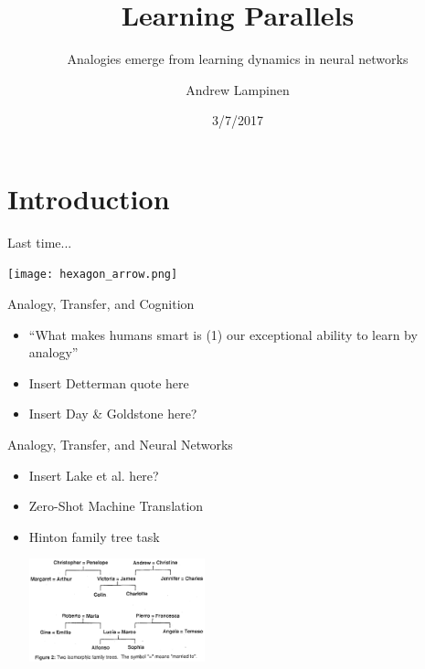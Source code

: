 \documentclass{beamer}
\begin{document}
\title{Learning Parallels}
\subtitle{Analogies emerge from learning dynamics in neural networks}
\author{Andrew Lampinen}
\date{3/7/2017}
\frame{\titlepage}


\section{Introduction}
\begin{frame}{Last time...}
\begin{center}
\texttt{[image: hexagon\_arrow.png]}
\end{center}
\end{frame}

\begin{frame}{Analogy, Transfer, and Cognition}
\begin{itemize}
    \item<1-> ``What makes humans smart is (1) our exceptional ability to learn by analogy'' \cite{Gentner2003} 
    \item<2-> Insert Detterman quote here
    \item<3-> Insert Day \& Goldstone here? 
\end{itemize}
\end{frame}

\begin{frame}{Analogy, Transfer, and Neural Networks}
\begin{itemize}
    \item<1-> Insert Lake et al. here? 
    \item<2-> Zero-Shot Machine Translation \cite{Johnson2016}
    \item<3-> Hinton family tree task \cite{Hinton1986}
    \begin{center}
	\includegraphics[width = 0.4\textwidth]{../writing/cogsci_2017/figures/hinton_family_tree_figure.png}
   \end{center}
\end{itemize}
\end{frame}
\end{document}
